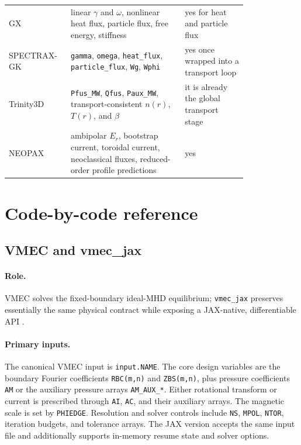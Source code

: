 \documentclass[11pt]{article}
\newcommand{\code}[1]{\texttt{#1}}
\begin{document}
{\begin{longtable}{L{0.16\linewidth}L{0.42\linewidth}L{0.23\linewidth}}
GX &
linear \(\gamma\) and \(\omega\), nonlinear heat flux, particle flux, free
energy, stiffness &
yes for heat and particle flux \\

SPECTRAX-GK &
\code{gamma}, \code{omega}, \code{heat\_flux}, \code{particle\_flux},
\code{Wg}, \code{Wphi} &
yes once wrapped into a transport loop \\

Trinity3D &
\code{Pfus\_MW}, \code{Qfus}, \code{Paux\_MW}, transport-consistent
\(n(r)\), \(T(r)\), and \(\beta\) &
it is already the global transport stage \\

NEOPAX &
ambipolar \(E_r\), bootstrap current, toroidal current, neoclassical fluxes,
reduced-order profile predictions &
yes \\
\bottomrule
\end{longtable}
}

\section{Code-by-code reference}

\subsection{VMEC and vmec\_jax}

\paragraph{Role.}
VMEC solves the fixed-boundary ideal-MHD equilibrium; \code{vmec\_jax}
preserves essentially the same physical contract while exposing a JAX-native,
differentiable API \citep{HirshmanWhitson1983,VMECRepo,VMECJaxRepo}.

\paragraph{Primary inputs.}
The canonical VMEC input is \code{input.NAME}. The core design variables are
the boundary Fourier coefficients \code{RBC(m,n)} and \code{ZBS(m,n)}, plus
pressure coefficients \code{AM} or the auxiliary pressure arrays
\code{AM\_AUX\_*}. Either rotational transform or current is prescribed through
\code{AI}, \code{AC}, and their auxiliary arrays. The magnetic scale is set by
\code{PHIEDGE}. Resolution and solver controls include \code{NS},
\code{MPOL}, \code{NTOR}, iteration budgets, and tolerance arrays. The JAX
version accepts the same input file and additionally supports in-memory resume
state and solver options.
\end{document}
